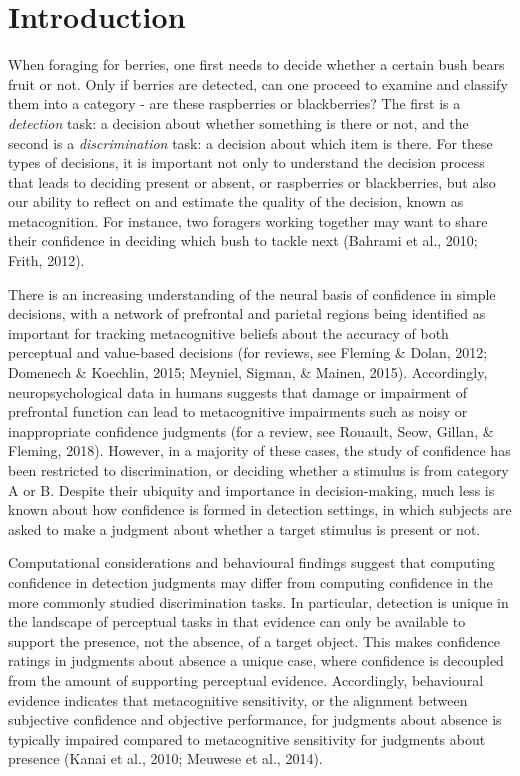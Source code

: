 \documentclass[12pt,twoside]{reedthesis}
\begin{document}
\hypertarget{introduction-3}{%
\section{Introduction}\label{introduction-3}}

When foraging for berries, one first needs to decide whether a certain bush bears fruit or not. Only if berries are detected, can one proceed to examine and classify them into a category - are these raspberries or blackberries? The first is a \emph{detection} task: a decision about whether something is there or not, and the second is a \emph{discrimination} task: a decision about which item is there. For these types of decisions, it is important not only to understand the decision process that leads to deciding present or absent, or raspberries or blackberries, but also our ability to reflect on and estimate the quality of the decision, known as metacognition. For instance, two foragers working together may want to share their confidence in deciding which bush to tackle next (Bahrami et al., 2010; Frith, 2012).

There is an increasing understanding of the neural basis of confidence in simple decisions, with a network of prefrontal and parietal regions being identified as important for tracking metacognitive beliefs about the accuracy of both perceptual and value-based decisions (for reviews, see Fleming \& Dolan, 2012; Domenech \& Koechlin, 2015; Meyniel, Sigman, \& Mainen, 2015). Accordingly, neuropsychological data in humans suggests that damage or impairment of prefrontal function can lead to metacognitive impairments such as noisy or inappropriate confidence judgments (for a review, see Rouault, Seow, Gillan, \& Fleming, 2018). However, in a majority of these cases, the study of confidence has been restricted to discrimination, or deciding whether a stimulus is from category A or B. Despite their ubiquity and importance in decision-making, much less is known about how confidence is formed in detection settings, in which subjects are asked to make a judgment about whether a target stimulus is present or not.

Computational considerations and behavioural findings suggest that computing confidence in detection judgments may differ from computing confidence in the more commonly studied discrimination tasks. In particular, detection is unique in the landscape of perceptual tasks in that evidence can only be available to support the presence, not the absence, of a target object. This makes confidence ratings in judgments about absence a unique case, where confidence is decoupled from the amount of supporting perceptual evidence. Accordingly, behavioural evidence indicates that metacognitive sensitivity, or the alignment between subjective confidence and objective performance, for judgments about absence is typically impaired compared to metacognitive sensitivity for judgments about presence (Kanai et al., 2010; Meuwese et al., 2014).
\end{document}
